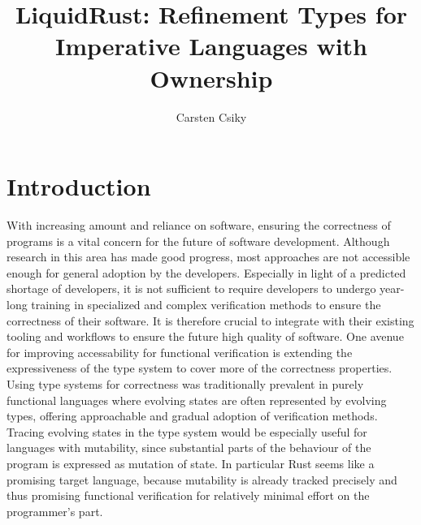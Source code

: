 \documentclass[twoside, english]{sdqthesis}
\author{Carsten Csiky}
\title{LiquidRust: Refinement Types for Imperative Languages with Ownership}
\theoremstyle{definition}
\begin{document}
\setpdf

\maketitle

\frontmatter



\setcounter{page}{1}

 


\tableofcontents

\listoffigures
\listoftables
\listoflistings


\mainmatter

\iftrue %
\chapter{Introduction}

With increasing amount and reliance on software, ensuring the correctness of programs is a vital concern for the future of software development.
Although research in this area has made good progress, most approaches are not accessible enough for general adoption by the developers. Especially in light of a predicted shortage of developers\cite{breaux_2021_2021-1}, it is not sufficient to require developers to undergo year-long training in specialized and complex verification methods to ensure the correctness of their software. It is therefore crucial to integrate with their existing tooling and workflows to ensure the future high quality of software.
One avenue for improving accessability for functional verification is extending the expressiveness of the type system to cover more of the correctness properties.
Using type systems for correctness was traditionally prevalent in purely functional languages where evolving states are often represented by evolving types, offering approachable and gradual adoption of verification methods. Tracing evolving states in the type system would be especially useful for languages with mutability, since substantial parts of the behaviour of the program is expressed as mutation of state. In particular Rust seems like a promising target language, because mutability is already tracked precisely and thus promising functional verification for relatively minimal effort on the programmer's part.
\end{document}
